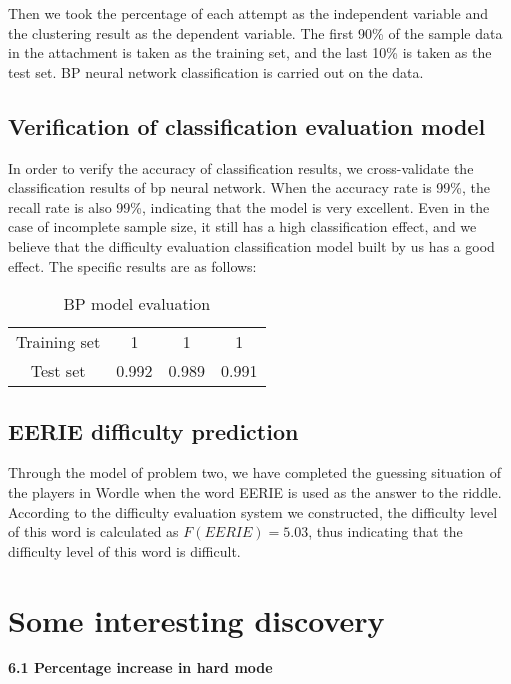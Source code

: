 \documentclass{mcmthesis}
\begin{document}
Then we took the percentage of each attempt as the independent variable and the clustering result as the dependent variable. The first 90\% of the sample data in the attachment is taken as the training set, and the last 10\% is taken as the test set. BP neural network classification is carried out on the data.

\subsection{Verification of classification evaluation model}
In order to verify the accuracy of classification results, we cross-validate the classification results of bp neural network. When the accuracy rate is 99\%, the recall rate is also 99\%, indicating that the model is very excellent. Even in the case of incomplete sample size, it still has a high classification effect, and we believe that the difficulty evaluation classification model built by us has a good effect. The specific results are as follows:
\begin{table}[H]
	\centering
	\renewcommand\arraystretch{1.1}
	\caption{\small BP model evaluation}
	\begin{tabular}{cccc}
		\toprule[1.5pt]
		\makebox[0.2\textwidth][c]{BP} & \makebox[0.2\textwidth][c]{Accuracy rate} & \makebox[0.2\textwidth][c]{Recall rate}
		& \makebox[0.2\textwidth][c]{F1} \\
		\midrule[1.5pt]
		Training set & 1             & 1           & 1     \\
Test set     & 0.992         & 0.989       & 0.991 \\
		\bottomrule[1.5pt]
	\end{tabular}
\end{table}

\subsection{EERIE difficulty prediction}
Through the model of problem two, we have completed the guessing situation of the players in Wordle when the word EERIE is used as the answer to the riddle. According to the difficulty evaluation system we constructed, the difficulty level of this word is calculated as $F(EERIE)=5.03$, thus indicating that the difficulty level of this word is difficult.

\section{Some interesting discovery}
\noindent
\textbf{6.1 Percentage increase in hard mode}
\end{document}

